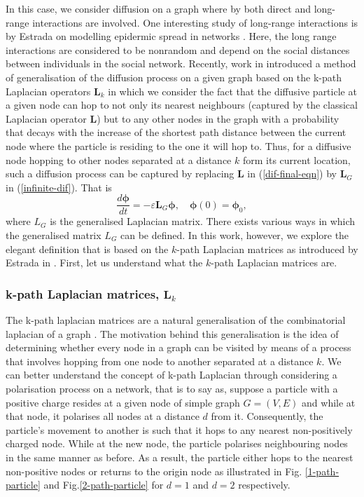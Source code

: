 \documentclass[10pt,a4paper]{article}
\begin{document}
    	    
    	   	In this case, we consider diffusion on a graph where by both direct and long-range interactions are involved. One interesting study of long-range interactions is by Estrada on modelling epidermic spread in networks \citep{estrada2011epidemic}. Here, the long range interactions are considered to be nonrandom and depend on the social distances between individuals in the social network.
    	    Recently, work in \citep{estrada2012path} introduced a method of generalisation of the diffusion process on a given graph based on the k-path Laplacian operators $\mathbf{L}_k$ in which we consider the fact that the diffusive particle at a given node can hop to not only its nearest neighbours (captured by the classical Laplacian operator $\mathbf{L}$) but to any other nodes in the graph with a probability that decays with the increase of the shortest path distance between the current node where the particle is residing to the one it will hop to. Thus, for a diffusive node hopping to other nodes separated at a distance $k$ form its current location, such a diffusion process can be captured by replacing $\mathbf{L}$ in (\ref{dif-final-eqn}) by $\mathbf{L}_G$ in (\ref{infinite-dif}). That is 
    	    \begin{equation}
    	    \frac{d\boldsymbol{\phi}}{dt} = -\varepsilon \mathbf{L}_{G}\boldsymbol{\phi}, \quad \boldsymbol{\phi}(0) = \boldsymbol{\phi}_0 ,
    	    \label{gen-difeqn}
    	    \end{equation}
    	    where $L_G$ is the generalised Laplacian matrix. 
    	    There exists various ways in which the generalised matrix $L_G$ can be defined. In this work, however, we explore the elegant definition that is based on the $k$-path Laplacian matrices as introduced by Estrada in \citep{estrada2012path}. First, let us understand what the $k$-path Laplacian matrices are.
    	    \subsubsection{ k-path Laplacian matrices, $\mathbf{L}_k$}
    	    The k-path laplacian matrices are a natural generalisation of the combinatorial laplacian of a graph \citep{estrada2012path}. The motivation behind this generalisation is the idea of determining whether every node in a graph can be visited by means of a process that involves hopping from one node to another separated at a distance $k$. We can better understand the concept of k-path Laplacian through considering a polarisation process on a network, that is to say as, suppose a particle with a positive charge resides at a given node of simple graph $G= (V,E)$ and while at that node, it polarises all nodes at a distance $d$ from it. Consequently, the particle's movement to another is such that it hops to any nearest non-positively charged node. While at the new node, the particle polarises neighbouring nodes in the same manner as before. As a result, the particle either hops to the nearest non-positive nodes or returns to the origin node as illustrated in Fig. \ref{1-path-particle} and Fig.\ref{2-path-particle} for $d=1$ and $d=2$ respectively.
    	    
\end{document}
